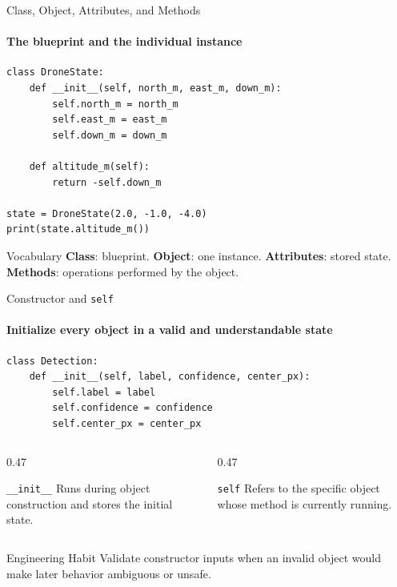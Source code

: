 \begin{frame}[fragile]{Class, Object, Attributes, and Methods}
\framesubtitle{The blueprint and the individual instance}

\footnotesize
\begin{verbatim}
class DroneState:
    def __init__(self, north_m, east_m, down_m):
        self.north_m = north_m
        self.east_m = east_m
        self.down_m = down_m

    def altitude_m(self):
        return -self.down_m

state = DroneState(2.0, -1.0, -4.0)
print(state.altitude_m())
\end{verbatim}
\begin{block}{Vocabulary}
\textbf{Class}: blueprint. \textbf{Object}: one instance. \textbf{Attributes}: stored state. \textbf{Methods}: operations performed by the object.
\end{block}
\end{frame}

\begin{frame}[fragile]{Constructor and \texttt{self}}
\framesubtitle{Initialize every object in a valid and understandable state}
\begin{verbatim}
class Detection:
    def __init__(self, label, confidence, center_px):
        self.label = label
        self.confidence = confidence
        self.center_px = center_px
\end{verbatim}
\begin{columns}[T,onlytextwidth]
\begin{column}{0.47\textwidth}
\begin{block}{\texttt{\_\_init\_\_}}
Runs during object construction and stores the initial state.
\end{block}
\end{column}
\hfill
\begin{column}{0.47\textwidth}
\begin{block}{\texttt{self}}
Refers to the specific object whose method is currently running.
\end{block}
\end{column}
\end{columns}
\begin{exampleblock}{Engineering Habit}
Validate constructor inputs when an invalid object would make later behavior ambiguous or unsafe.
\end{exampleblock}
\end{frame}

